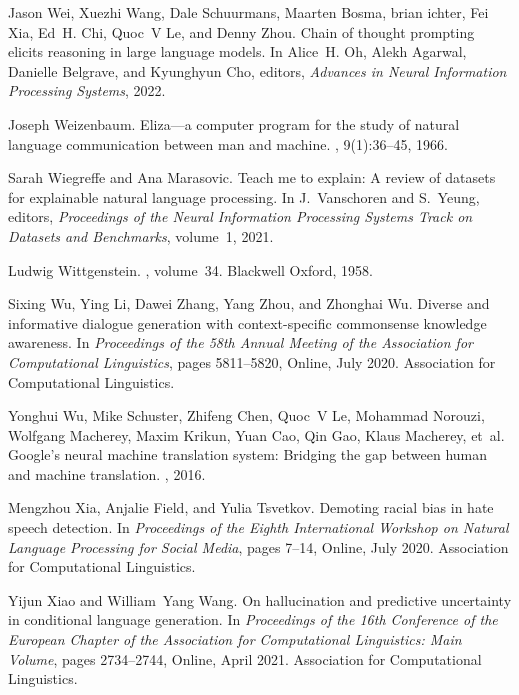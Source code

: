 \documentclass[11pt]{article}
\begin{document}
\begin{thebibliography}{100}
Jason Wei, Xuezhi Wang, Dale Schuurmans, Maarten Bosma, brian ichter, Fei Xia,
  Ed~H. Chi, Quoc~V Le, and Denny Zhou.
\newblock Chain of thought prompting elicits reasoning in large language
  models.
\newblock In Alice~H. Oh, Alekh Agarwal, Danielle Belgrave, and Kyunghyun Cho,
  editors, {\em Advances in Neural Information Processing Systems}, 2022.

Joseph Weizenbaum.
\newblock Eliza—a computer program for the study of natural language
  communication between man and machine.
, 9(1):36--45, 1966.

Sarah Wiegreffe and Ana Marasovic.
\newblock Teach me to explain: A review of datasets for explainable natural
  language processing.
\newblock In J.~Vanschoren and S.~Yeung, editors, {\em Proceedings of the
  Neural Information Processing Systems Track on Datasets and Benchmarks},
  volume~1, 2021.

Ludwig Wittgenstein.
, volume~34.
\newblock Blackwell Oxford, 1958.

Sixing Wu, Ying Li, Dawei Zhang, Yang Zhou, and Zhonghai Wu.
\newblock Diverse and informative dialogue generation with context-specific
  commonsense knowledge awareness.
\newblock In {\em Proceedings of the 58th Annual Meeting of the Association for
  Computational Linguistics}, pages 5811--5820, Online, July 2020. Association
  for Computational Linguistics.

Yonghui Wu, Mike Schuster, Zhifeng Chen, Quoc~V Le, Mohammad Norouzi, Wolfgang
  Macherey, Maxim Krikun, Yuan Cao, Qin Gao, Klaus Macherey, et~al.
\newblock Google's neural machine translation system: Bridging the gap between
  human and machine translation.
, 2016.

Mengzhou Xia, Anjalie Field, and Yulia Tsvetkov.
\newblock Demoting racial bias in hate speech detection.
\newblock In {\em Proceedings of the Eighth International Workshop on Natural
  Language Processing for Social Media}, pages 7--14, Online, July 2020.
  Association for Computational Linguistics.

Yijun Xiao and William~Yang Wang.
\newblock On hallucination and predictive uncertainty in conditional language
  generation.
\newblock In {\em Proceedings of the 16th Conference of the European Chapter of
  the Association for Computational Linguistics: Main Volume}, pages
  2734--2744, Online, April 2021. Association for Computational Linguistics.


\end{thebibliography}
\end{document}
